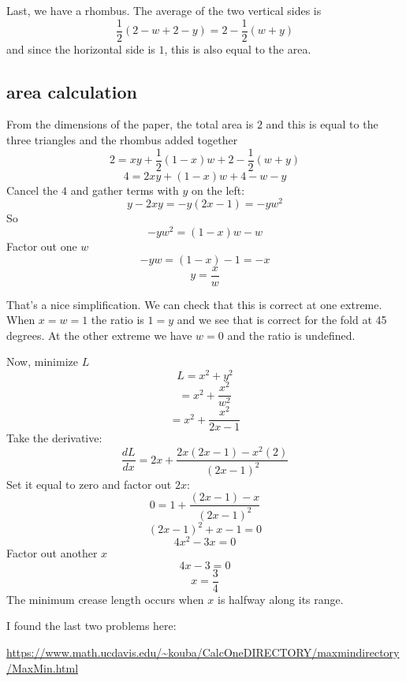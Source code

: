 \documentclass[11pt, oneside]{article}
\begin{document}
Last, we have a rhombus.  The average of the two vertical sides is 
\[ \frac{1}{2} (2 - w + 2 - y) = 2 - \frac{1}{2} (w + y) \]
and since the horizontal side is $1$, this is also equal to the area.

\subsection*{area calculation}

From the dimensions of the paper, the total area is $2$ and this is equal to the three triangles and the rhombus added together
\[ 2 = xy + \frac{1}{2} (1-x) w  + 2 - \frac{1}{2} (w + y)  \]
\[ 4 = 2xy + (1-x)w  + 4 - w - y \]
Cancel the $4$ and gather terms with $y$ on the left:
\[ y - 2xy =  -y(2x - 1) = -yw^2 \]
So
\[ -yw^2 = (1-x)w - w \]
Factor out one $w$
\[ -yw = (1 - x) - 1 = -x \]
\[ y = \frac{x}{w} \]

That's a nice simplification.  We can check that this is correct at one extreme.  When $x = w = 1$ the ratio is $1 = y$ and we see that is correct for the fold at 45 degrees.  At the other extreme we have $w = 0$ and the ratio is undefined.

Now, minimize $L$
\[ L = x^2 + y^2 \]
\[ = x^2 + \frac{x^2}{w^2} \]
\[ = x^2 + \frac{x^2}{2x - 1} \]
Take the derivative:
\[ \frac{dL}{dx} = 2x + \frac{2x (2x - 1) - x^2 (2)}{(2x -1)^2} \]
Set it equal to zero and factor out $2x$:
\[0 = 1 + \frac{(2x - 1) - x}{(2x -1)^2} \]
\[ (2x - 1)^2 + x - 1 = 0 \]
\[ 4x^2 - 3x = 0 \]
Factor out another $x$
\[ 4x - 3 = 0 \]
\[ x = \frac{3}{4} \]
The minimum crease length occurs when $x$ is halfway along its range.

I found the last two problems here:

\url{https://www.math.ucdavis.edu/~kouba/CalcOneDIRECTORY/maxmindirectory/MaxMin.html}
\end{document}

